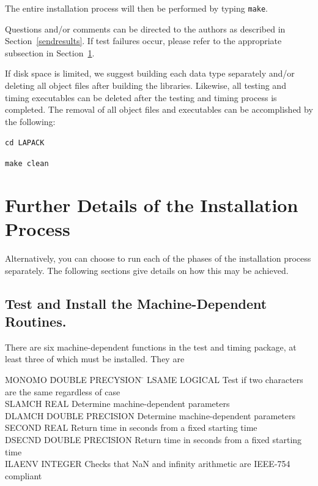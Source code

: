 \documentclass[11pt]{report}
\begin{document}
The entire installation process will then be performed by typing
\texttt{make}.

Questions and/or comments can be directed to the
authors as described in Section~\ref{sendresults}.  If test failures
occur, please refer to the appropriate subsection in
Section~\ref{furtherdetails}.

If disk space is limited, we suggest building each data type separately
and/or deleting all object files after building the libraries.  Likewise, all
testing and timing executables can be deleted after the testing and timing
process is completed.  The removal of all object files and executables
can be accomplished by the following:

\begin{list}{}{}
\item \texttt{cd LAPACK}
\item \texttt{make clean}
\end{list}

\section{Further Details of the Installation Process}\label{furtherdetails}

Alternatively, you can choose to run each of the phases of the
installation process separately.  The following sections give details
on how this may be achieved.

\subsection{Test and Install the Machine-Dependent Routines.}

There are six machine-dependent functions in the test and timing
package, at least three of which must be installed.  They are

\begin{tabbing}
MONOMO  \=  DOUBLE PRECYSION  \=  \kill
LSAME   \>  LOGICAL      \> Test if two characters are the same regardless of case \\
SLAMCH  \>  REAL  \> Determine machine-dependent parameters \\
DLAMCH  \>  DOUBLE PRECISION \> Determine machine-dependent parameters \\
SECOND  \>  REAL  \> Return time in seconds from a fixed starting time \\
DSECND  \>  DOUBLE PRECISION  \> Return time in seconds from a fixed starting time\\
ILAENV  \>  INTEGER \> Checks that NaN and infinity arithmetic are IEEE-754 compliant
\end{tabbing}
\end{document}
